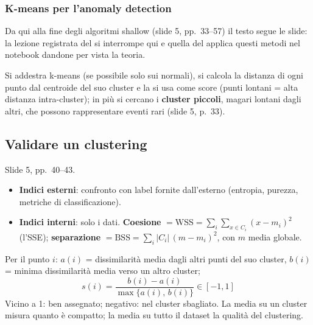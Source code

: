 \subsubsection{K-means per l'anomaly detection}
\begin{nota}
Da qui alla fine degli algoritmi shallow (slide 5, pp.\ 33--57) il testo segue le slide: la lezione registrata del  si
interrompe qui e quella del  applica questi metodi nel notebook dandone per vista la teoria.
\end{nota}
Si addestra k-means (se possibile solo sui normali), si calcola la distanza di ogni punto dal centroide del suo cluster e la si usa come
score (punti lontani = alta distanza intra-cluster); in più si cercano i \textbf{cluster piccoli}, magari lontani dagli altri, che possono
rappresentare eventi rari (slide 5, p.~33).

\subsection{Validare un clustering}
Slide 5, pp.\ 40--43.
\begin{itemize}
  \item \textbf{Indici esterni}: confronto con label fornite dall'esterno (entropia, purezza, metriche di classificazione).
  \item \textbf{Indici interni}: solo i dati. \textbf{Coesione} $= \mathrm{WSS} = \sum_i\sum_{x\in C_i}(x-m_i)^2$ (l'SSE);
        \textbf{separazione} $= \mathrm{BSS} = \sum_i |C_i|\,(m-m_i)^2$, con $m$ media globale.
\end{itemize}
\begin{definizione}[silhouette]
Per il punto $i$: $a(i)$ = dissimilarità media dagli altri punti del suo cluster, $b(i)$ = minima dissimilarità media verso un altro cluster;
\[
s(i) = \frac{b(i)-a(i)}{\max\{a(i),\,b(i)\}} \in [-1, 1]
\]
Vicino a 1: ben assegnato; negativo: nel cluster sbagliato. La media su un cluster misura quanto è compatto; la media su tutto il dataset
la qualità del clustering.
\end{definizione}

